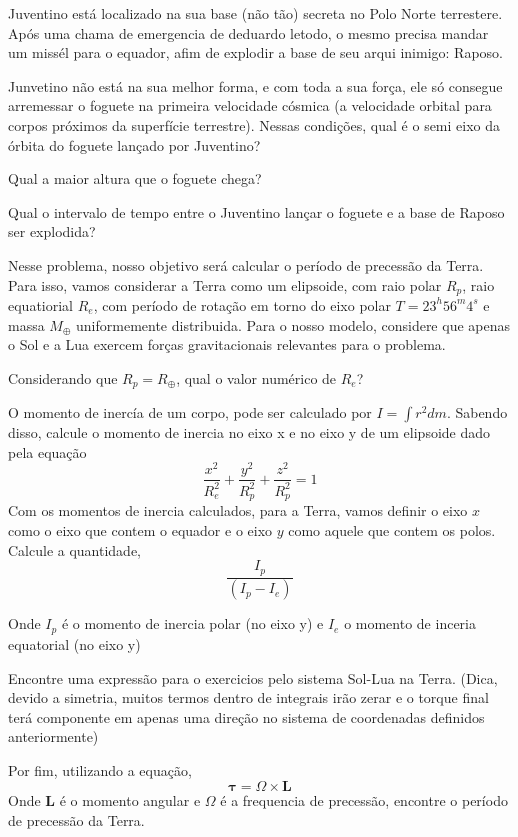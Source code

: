 \documentclass[11pt]{article}
\begin{document}
\begin{pproblem} Juventino está localizado na sua base (não tão) secreta no Polo Norte terrestere. Após uma chama de emergencia de deduardo letodo, o mesmo precisa mandar um missél para o equador, afim de explodir a base de seu arqui inimigo: Raposo. 
    \begin{alternativas}
        \item Junvetino não está na sua melhor forma, e com toda a sua força, ele só consegue arremessar o foguete na primeira velocidade cósmica (a velocidade orbital para corpos próximos da superfície terrestre). Nessas condições, qual é o semi eixo da órbita do foguete lançado por Juventino?
        \item Qual a maior altura que o foguete chega?
        \item Qual o intervalo de tempo entre o Juventino lançar o foguete e a base de Raposo ser explodida?
    \end{alternativas}
    
\end{pproblem}

\begin{pproblem}
    Nesse problema, nosso objetivo será calcular o período de precessão da Terra. Para isso, vamos considerar a Terra como um elipsoide, com raio polar $R_p$, raio equatiorial $R_e$, com período de rotação em torno do eixo polar $T = 23^h56^m4^s$ e massa $M_\oplus$ uniformemente distribuida. Para o nosso modelo, considere que apenas o Sol e a Lua exercem forças gravitacionais relevantes para o problema.
    \begin{alternativas}
        \item Considerando que $R_p = R_\oplus$, qual o valor numérico de $R_e$?
        
        \item O momento de inercía de um corpo, pode ser calculado por $I = \int r^2 dm$. Sabendo disso, calcule o momento de inercia no eixo x e no eixo y de um elipsoide dado pela equação 
        $$\frac{x^2}{R_e^2} + \frac{y^2}{R_p^2} + \frac{z^2}{R_p^2}= 1$$
        Com os momentos de inercia calculados, para a Terra, vamos definir o eixo $x$ como o eixo que contem o equador e o eixo $y$ como aquele que contem os polos. Calcule a quantidade, 
        $$\frac{I_p}{(I_p-I_e)}$$

        Onde $I_p$ é o momento de inercia polar (no eixo y) e $I_e$ o momento de inceria equatorial (no eixo y)
        

        \item Encontre uma expressão para o exercicios pelo sistema Sol-Lua na Terra. (Dica, devido a simetria, muitos termos dentro de integrais irão zerar e o torque final terá componente em apenas uma direção no sistema de coordenadas definidos anteriormente)
        \item Por fim, utilizando a equação, 
        $$\mathbf{\tau } = \Omega \times \mathbf{L} $$
        Onde $\mathbf{L}$ é o momento angular e $\Omega$ é a frequencia de precessão, encontre o período de precessão da Terra.
    \end{alternativas}
\end{pproblem}

    
\end{document}
